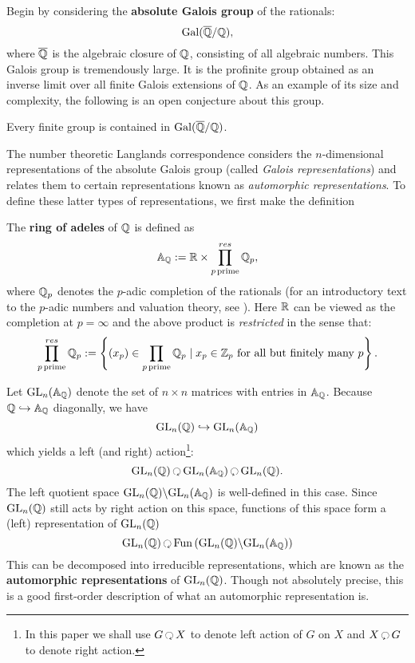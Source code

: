 Begin by considering the \textbf{absolute Galois group} of the rationals:
\[
	\mathrm{Gal}(\overline{\mathbb{Q}}/\mathbb{Q}),
\]
where $\overline{\mathbb{Q}}$ is the algebraic closure of $\mathbb{Q}$, consisting of all algebraic numbers. This Galois group is tremendously large. It is the profinite group obtained as an inverse limit over all finite Galois extensions of $\mathbb{Q}$. As an example of its size and complexity, the following is an open conjecture about this group. 
\begin{conj}
	Every finite group is contained in $\mathrm{Gal}(\overline{\mathbb{Q}}/\mathbb{Q})$.
\end{conj}
The number theoretic Langlands correspondence considers the $n$-dimensional representations of the absolute Galois group (called \emph{Galois representations}) and relates them to certain representations known as \emph{automorphic representations}. To define these latter types of representations, we first make the definition
\begin{defn}
	The \textbf{ring of adeles} of $\mathbb{Q}$ is defined as 
	\[
		\mathbb A_{\mathbb{Q}} := \mathbb{R} \times \prod_{p\, \mathrm{prime}}^{res} \mathbb{Q}_p,
	\]
	where $\mathbb{Q}_p$ denotes the $p$-adic completion of the rationals (for an introductory text to the $p$-adic numbers and valuation theory, see \cite{bachman1964}). Here $\mathbb{R}$ can be viewed as the completion at $p=\infty$ and the above product is \emph{restricted} in the sense that:
	\[
		\prod_{p\, \mathrm{prime}}^{res} \mathbb{Q}_p := \left\{ (x_p) \in \prod_{p\, \mathrm{prime}} \mathbb{Q}_p \mid x_p \in \mathbb Z_p \text{ for all but finitely many } p\right\}.
	\]
\end{defn}
Let $\mathrm{GL}_n(\mathbb A_{\mathbb{Q}})$ denote the set of $n \times n$ matrices with entries in $\mathbb A_{\mathbb{Q}}$. Because $\mathbb{Q} \hookrightarrow \mathbb A_{\mathbb{Q}}$ diagonally, we have 
\[
	\mathrm{GL}_n(\mathbb{Q}) \hookrightarrow \mathrm{GL}_n(\mathbb A_{\mathbb{Q}})
\]
which yields a left (and right) action\footnote{In this paper we shall use $G\lacts X$ to denote left action of $G$ on $X$ and $X \racts G$ to denote right action.}:
\[
	\GL_n(\qq) \lacts  \GL_n(\mathbb A_\qq) \racts  \GL_n(\qq).
\]
The left quotient space $\mathrm{GL}_n(\mathbb{Q}) \backslash \mathrm{GL}_n(\mathbb A_{\mathbb{Q}})$ is well-defined in this case. Since $\mathrm{GL}_n(\mathbb{Q})$ still acts by right action on this space, functions of this space form a (left) representation of $\mathrm{GL}_n(\mathbb{Q})$
\[
	\GL_n(\qq) \lacts \mathrm{Fun}\left( \GL_n(\qq) \backslash \GL_n(\mathbb A_\qq) \right)
\]
This can be decomposed into irreducible representations, which are known as the \textbf{automorphic representations} of $\mathrm{GL}_n(\mathbb{Q})$.
Though not absolutely precise, this is a good first-order description of what an automorphic representation is. 

